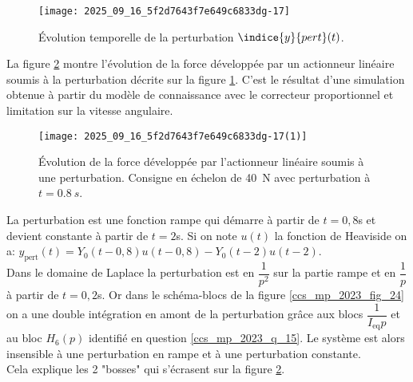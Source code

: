 \begin{figure}[!h]
\centering
\texttt{[image: 2025\_09\_16\_5f2d7643f7e649c6833dg-17]}
\caption{\label{ccs_mp_2023_fig_25}  Évolution temporelle de la perturbation $\indice{y}{pert}(t)$.}

\end{figure}



La figure \ref{ccs_mp_2023_fig_26} montre l'évolution de la force développée par un actionneur linéaire soumis à la perturbation décrite sur la figure \ref{ccs_mp_2023_fig_25}. C'est le résultat d'une simulation obtenue à partir du modèle de connaissance avec le correcteur proportionnel et limitation sur la vitesse angulaire.
%


\begin{figure}[!h]
\centering
\texttt{[image: 2025\_09\_16\_5f2d7643f7e649c6833dg-17(1)]}
\caption{\label{ccs_mp_2023_fig_26}   Évolution de la force développée par l'actionneur linéaire soumis à une perturbation. Consigne en échelon de \SI{40}{N} avec perturbation à $t=\SI{0,8}{s}$.}

\end{figure}
\fi



\ifprof
\begin{corrige}
La perturbation est une fonction rampe qui démarre à partir de $t=0,8$s et devient constante à partir de $t=2$s. Si on note $u(t)$ la fonction de Heaviside on a: $y_{\text{pert}}(t) = Y_0(t-0,8)u(t-0,8) - Y_0(t-2)u(t-2)$.\\

Dans le domaine de Laplace la perturbation est en $\dfrac{1}{p^2}$ sur la partie rampe et en $\dfrac{1}{p}$ à partir de $t=0,2$s. Or dans le schéma-blocs de la figure \ref{ccs_mp_2023_fig_24} on a une double intégration en amont de la perturbation grâce aux blocs $\dfrac{1}{I_{\text{eq}}p}$ et au bloc $H_6(p)$ identifié en question \ref{ccs_mp_2023_q_15}. Le système est alors insensible à une perturbation en rampe et à une perturbation constante.\\

Cela explique les 2 "bosses" qui s'écrasent sur la figure \ref{ccs_mp_2023_fig_26}.

\end{corrige}
\else
\fi



